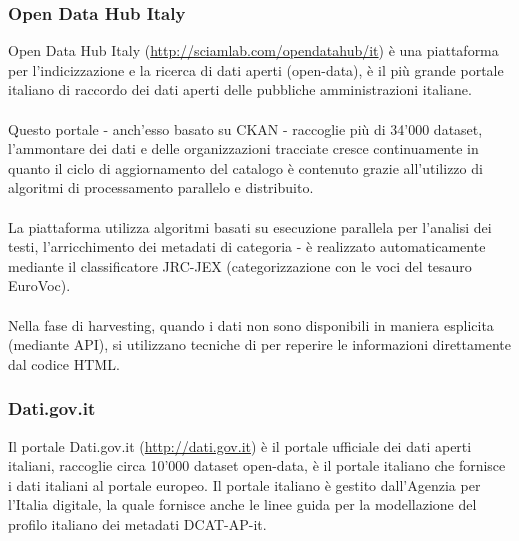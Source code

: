 \documentclass{article}
\theoremstyle{plain}
\theoremstyle{definition}
\begin{document}
\subsubsection{Open Data Hub Italy}
Open Data Hub Italy (\url{http://sciamlab.com/opendatahub/it}) è una piattaforma per l'indicizzazione e la ricerca di dati aperti (open-data), è il più grande portale italiano di raccordo dei dati aperti delle pubbliche amministrazioni italiane. 
\\
\\
Questo portale - anch'esso basato su CKAN - raccoglie più di 34'000 dataset, l'ammontare dei dati e delle organizzazioni tracciate cresce continuamente in quanto il ciclo di aggiornamento del catalogo è contenuto grazie all'utilizzo di algoritmi di processamento parallelo e distribuito.
\\
\\
La piattaforma utilizza algoritmi basati su esecuzione parallela per l'analisi dei testi, l'arricchimento dei metadati di categoria - è realizzato automaticamente mediante il classificatore JRC-JEX (categorizzazione con le voci del tesauro EuroVoc).
\\
\\
Nella fase di harvesting, quando i dati non sono disponibili in maniera esplicita (mediante API), si utilizzano tecniche di  per reperire le informazioni direttamente dal codice HTML.
\subsubsection{Dati.gov.it}
Il portale Dati.gov.it (\url{http://dati.gov.it}) è il portale ufficiale dei dati aperti italiani, raccoglie circa 10'000 dataset open-data, è il portale italiano che fornisce i dati italiani al portale europeo. Il portale italiano è gestito dall'Agenzia per l'Italia digitale, la quale fornisce anche le linee guida per la modellazione del profilo italiano dei metadati DCAT-AP-it.
\end{document}
